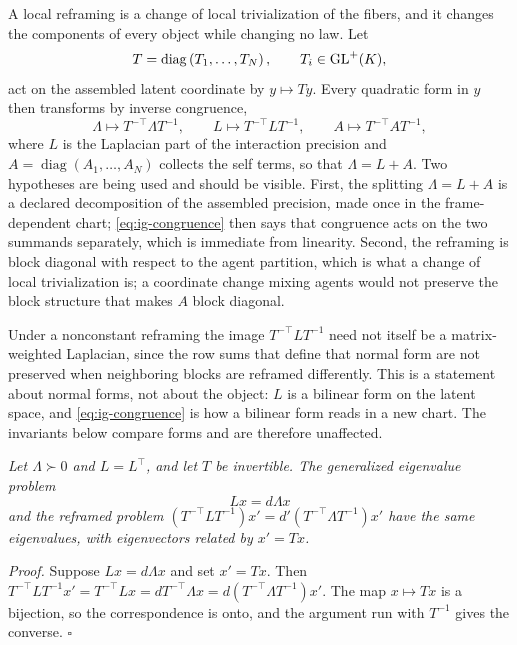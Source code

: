 A local reframing is a change of local trivialization of the fibers, and it changes the components of every object while changing no law. Let
\begin{equation}
T=\operatorname{diag}\left(T_1,\dots,T_N\right),
\qquad
T_i\in\mathrm{GL}^{+}(K),
\label{eq:ig-reframing}
\end{equation}
act on the assembled latent coordinate by $y\mapsto Ty$. Every quadratic form in $y$ then transforms by inverse congruence,
\begin{equation}
\Lambda\longmapsto T^{-\top}\Lambda T^{-1},
\qquad
L\longmapsto T^{-\top}LT^{-1},
\qquad
A\longmapsto T^{-\top}AT^{-1},
\label{eq:ig-congruence}
\end{equation}
where $L$ is the Laplacian part of the interaction precision and $A=\operatorname{diag}(A_1,\dots,A_N)$ collects the self terms, so that $\Lambda=L+A$. Two hypotheses are being used and should be visible. First, the splitting $\Lambda=L+A$ is a declared decomposition of the assembled precision, made once in the frame-dependent chart; \eqref{eq:ig-congruence} then says that congruence acts on the two summands separately, which is immediate from linearity. Second, the reframing is block diagonal with respect to the agent partition, which is what a change of local trivialization is; a coordinate change mixing agents would not preserve the block structure that makes $A$ block diagonal. 

Under a nonconstant reframing the image $T^{-\top}LT^{-1}$ need not itself be a matrix-weighted Laplacian, since the row sums that define that normal form are not preserved when neighboring blocks are reframed differently. This is a statement about normal forms, not about the object: $L$ is a bilinear form on the latent space, and \eqref{eq:ig-congruence} is how a bilinear form reads in a new chart. The invariants below compare forms and are therefore unaffected.

\medskip
{}
\emph{Let $\Lambda\succ0$ and $L=L^\top$, and let $T$ be invertible. The generalized eigenvalue problem}
\begin{equation}
Lx=d\Lambda x
\label{eq:ig-pencil}
\end{equation}
\emph{and the reframed problem $\left(T^{-\top}LT^{-1}\right)x'=d'\left(T^{-\top}\Lambda T^{-1}\right)x'$ have the same eigenvalues, with eigenvectors related by $x'=Tx$.}

\noindent\emph{Proof.} Suppose $Lx=d\Lambda x$ and set $x'=Tx$. Then $T^{-\top}LT^{-1}x'=T^{-\top}Lx=d T^{-\top}\Lambda x=d\left(T^{-\top}\Lambda T^{-1}\right)x'$. The map $x\mapsto Tx$ is a bijection, so the correspondence is onto, and the argument run with $T^{-1}$ gives the converse. \hfill$\square$

